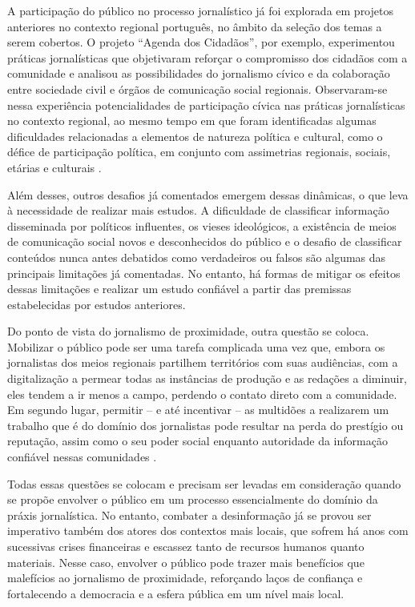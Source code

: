 \documentclass[portuguese]{textolivre}
\begin{document}
A participação do público no processo jornalístico já foi explorada em projetos anteriores no contexto regional português, no âmbito da seleção dos temas a serem cobertos. O projeto “Agenda dos Cidadãos”, por exemplo, experimentou práticas jornalísticas que objetivaram reforçar o compromisso dos cidadãos com a comunidade e analisou as possibilidades do jornalismo cívico e da colaboração entre sociedade civil e órgãos de comunicação social regionais. Observaram-se nessa experiência potencialidades de participação cívica nas práticas jornalísticas no contexto regional, ao mesmo tempo em que foram identificadas algumas dificuldades relacionadas a elementos de natureza política e cultural, como o défice de participação política, em conjunto com assimetrias regionais, sociais, etárias e culturais \cite{correia2014agenda}.

Além desses, outros desafios já comentados emergem dessas dinâmicas, o que leva à necessidade de realizar mais estudos. A dificuldade de classificar informação disseminada por políticos influentes, os vieses ideológicos, a existência de meios de comunicação social novos e desconhecidos do público e o desafio de classificar conteúdos nunca antes debatidos como verdadeiros ou falsos são algumas das principais limitações já comentadas. No entanto, há formas de mitigar os efeitos dessas limitações e realizar um estudo confiável a partir das premissas estabelecidas por estudos anteriores.

Do ponto de vista do jornalismo de proximidade, outra questão se coloca. Mobilizar o público pode ser uma tarefa complicada uma vez que, embora os jornalistas dos meios regionais partilhem territórios com suas audiências, com a digitalização a permear todas as instâncias de produção e as redações a diminuir, eles tendem a ir menos a campo, perdendo o contato direto com a comunidade. Em segundo lugar, permitir – e até incentivar – as multidões a realizarem um trabalho que é do domínio dos jornalistas pode resultar na perda do prestígio ou reputação, assim como o seu poder social enquanto autoridade da informação confiável nessas comunidades \cite{jeronimocorreia_are_2022}.

Todas essas questões se colocam e precisam ser levadas em consideração quando se propõe envolver o público em um processo essencialmente do domínio da práxis jornalística. No entanto, combater a desinformação já se provou ser imperativo também dos atores dos contextos mais locais, que sofrem há anos com sucessivas crises financeiras e escassez tanto de recursos humanos quanto materiais. Nesse caso, envolver o público pode trazer mais benefícios que malefícios ao jornalismo de proximidade, reforçando laços de confiança e fortalecendo a democracia e a esfera pública em um nível mais local.
\end{document}
